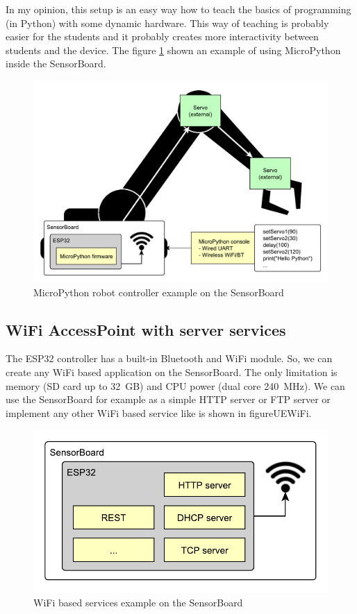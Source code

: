 In my opinion, this setup is an easy way how to teach the basics of programming (in Python) with some dynamic hardware. This way of teaching is probably easier for the students and it probably creates more interactivity between students and the device. The figure \ref{UEMicroPython} shown an example of using MicroPython inside the SensorBoard.

\begin{figure}[H]
	\centering
	\label{UEMicroPython}
	\caption{MicroPython robot controller example on the SensorBoard}
	\includegraphics[width=16cm]{img/UsageExamplesPythonRobot.pdf}
\end{figure}

\subsection{WiFi AccessPoint with server services}
The ESP32 controller has a built-in Bluetooth and WiFi module. So, we can create any WiFi based application on the SensorBoard. The only limitation is memory (SD card up to \SI{32}{GB}) and CPU power (dual core \SI{240}{MHz}). We can use the SensorBoard for example as a simple HTTP server \cite{ESP32:HTTPserver} or FTP server \cite{ESP32:FTPserver} or implement any other WiFi based service like is shown in figure{UEWiFi}.

\begin{figure}[H]
	\centering
	\label{UEWiFi}
	\caption{WiFi based services example on the SensorBoard}
	\includegraphics[scale=1]{img/UsageExamplesServer.pdf}
\end{figure}

